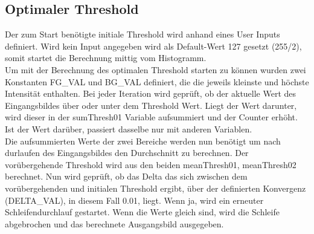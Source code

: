 \documentclass[12pt,german]{article}
\begin{document}
\subsection{Optimaler Threshold}
Der zum Start benötigte initiale Threshold wird anhand eines User Inputs definiert. Wird kein Input angegeben wird als Default-Wert 127 gesetzt (255/2), somit startet die Berechnung mittig vom Histogramm.\\
Um mit der Berechnung des optimalen Threshold starten zu können wurden zwei Konstanten FG\_VAL und BG\_VAL definiert, die die jeweils kleinste und höchste Intensität enthalten.  Bei jeder Iteration wird geprüft, ob der aktuelle Wert des Eingangsbildes über oder unter dem Threshold Wert. Liegt der Wert darunter, wird dieser in der sumThresh01 Variable aufsummiert und der Counter erhöht. Ist der Wert darüber, passiert dasselbe nur mit anderen Variablen.\\
Die aufsummierten Werte der zwei Bereiche werden nun benötigt um nach durlaufen des Eingangsbildes den Durchschnitt zu berechnen. Der vorübergehende Threshold wird aus den beiden meanThresh01, meanThresh02 berechnet. Nun wird geprüft, ob das Delta das sich zwischen dem vorübergehenden und initialen Threshold ergibt, über der definierten Konvergenz (DELTA\_VAL), in diesem Fall 0.01, liegt. Wenn ja, wird ein erneuter Schleifendurchlauf gestartet. Wenn die Werte gleich sind, wird die Schleife abgebrochen und das berechnete Ausgangsbild ausgegeben.
\end{document}
